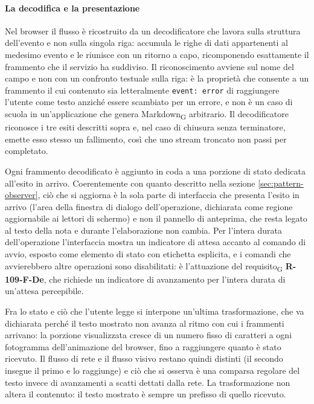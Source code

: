 \documentclass[a4paper, 10pt]{article}
\begin{document}
\paragraph{La decodifica e la presentazione}
Nel browser il flusso è ricostruito da un decodificatore che lavora sulla struttura dell'evento e non sulla singola riga: accumula le righe di dati appartenenti al medesimo evento e le riunisce con un ritorno a capo, ricomponendo esattamente il frammento che il servizio ha suddiviso. Il riconoscimento avviene sul nome del campo e non con un confronto testuale sulla riga: è la proprietà che consente a un frammento il cui contenuto sia letteralmente \texttt{event: error} di raggiungere l'utente come testo anziché essere scambiato per un errore, e non è un caso di scuola in un'applicazione che genera Markdown\textsubscript{G} arbitrario. Il decodificatore riconosce i tre esiti descritti sopra e, nel caso di chiusura senza terminatore, emette esso stesso un fallimento, così che uno stream troncato non passi per completato.

Ogni frammento decodificato è aggiunto in coda a una porzione di stato dedicata all'esito in arrivo. Coerentemente con quanto descritto nella sezione \ref{sec:pattern-observer}, ciò che si aggiorna è la sola parte di interfaccia che presenta l'esito in arrivo (l'area della finestra di dialogo dell'operazione, dichiarata come regione aggiornabile ai lettori di schermo) e non il pannello di anteprima, che resta legato al testo della nota e durante l'elaborazione non cambia. Per l'intera durata dell'operazione l'interfaccia mostra un indicatore di attesa accanto al comando di avvio, esposto come elemento di stato con etichetta esplicita, e i comandi che avvierebbero altre operazioni sono disabilitati: è l'attuazione del requisito\textsubscript{G} \textbf{R-109-F-De}, che richiede un indicatore di avanzamento per l'intera durata di un'attesa percepibile.

Fra lo stato e ciò che l'utente legge si interpone un'ultima trasformazione, che va dichiarata perché il testo mostrato non avanza al ritmo con cui i frammenti arrivano: la porzione visualizzata cresce di un numero fisso di caratteri a ogni fotogramma dell'animazione del browser, fino a raggiungere quanto è stato ricevuto. Il flusso di rete e il flusso visivo restano quindi distinti (il secondo insegue il primo e lo raggiunge) e ciò che si osserva è una comparsa regolare del testo invece di avanzamenti a scatti dettati dalla rete. La trasformazione non altera il contenuto: il testo mostrato è sempre un prefisso di quello ricevuto.
\end{document}
